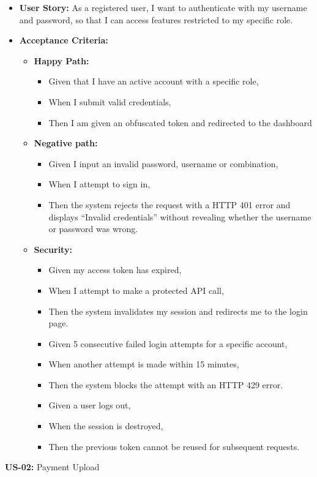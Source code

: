 \documentclass[11pt,a4paper]{article}
\begin{document}
\begin{itemize}
\item
  \textbf{User Story:} As a registered user, I want to authenticate with
  my username and password, so that I can access features restricted to
  my specific role.
\item
  \textbf{Acceptance Criteria:}

  \begin{itemize}
  \item
    \textbf{Happy Path:}

    \begin{itemize}
    \item
      Given that I have an active account with a specific role,
    \item
      When I submit valid credentials,
    \item
      Then I am given an obfuscated token and redirected to the
      dashboard
    \end{itemize}
  \item
    \textbf{Negative path:}

    \begin{itemize}
    \item
      Given I input an invalid password, username or combination,
    \item
      When I attempt to sign in,
    \item
      Then the system rejects the request with a HTTP 401 error and
      displays ``Invalid credentials'' without revealing whether the
      username or password was wrong.
    \end{itemize}
  \item
    \textbf{Security:}

    \begin{itemize}
    \item
      Given my access token has expired,
    \item
      When I attempt to make a protected API call,
    \item
      Then the system invalidates my session and redirects me to the
      login page.
    \item
      Given 5 consecutive failed login attempts for a specific account,
    \item
      When another attempt is made within 15 minutes,
    \item
      Then the system blocks the attempt with an HTTP 429 error.
    \item
      Given a user logs out,
    \item
      When the session is destroyed,
    \item
      Then the previous token cannot be reused for subsequent requests.
    \end{itemize}
  \end{itemize}
\end{itemize}
\textbf{US-02:} Payment Upload
\end{document}
